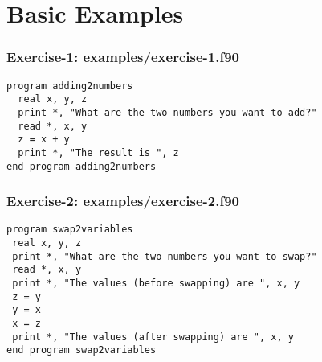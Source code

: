 \documentclass[xcolor=dvipsnames,dvip,notes=show,table]{beamer}
\begin{document}
\section{Basic Examples}

% 





\begin{frame}[fragile]
\frametitle{Exercise-1: examples/exercise-1.f90}
\scriptsize
\begin{lstlisting}
program adding2numbers
  real x, y, z
  print *, "What are the two numbers you want to add?"
  read *, x, y  
  z = x + y
  print *, "The result is ", z
end program adding2numbers
\end{lstlisting}
\end{frame}




\begin{frame}[fragile]
\frametitle{Exercise-2: examples/exercise-2.f90}
\scriptsize
\begin{lstlisting}
program swap2variables
 real x, y, z
 print *, "What are the two numbers you want to swap?"
 read *, x, y
 print *, "The values (before swapping) are ", x, y
 z = y
 y = x
 x = z
 print *, "The values (after swapping) are ", x, y
end program swap2variables
\end{lstlisting}
\end{frame}



\end{document}
